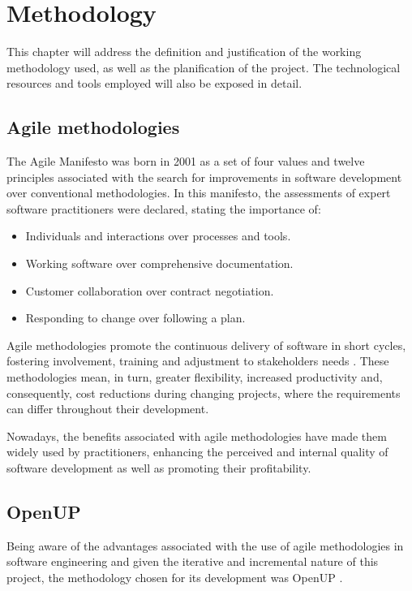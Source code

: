 \chapter{Methodology}
\label{cap:methodology}

This chapter will address the definition and justification of the working methodology used, as well as the planification of the project. The technological resources and tools employed will also be exposed in detail.

\section{Agile methodologies}
\label{sec:agileMethodologies}

The Agile Manifesto \cite{agile_manifesto} was born in 2001 as a set of four values and twelve principles associated with the search for improvements in software development over conventional methodologies. In this manifesto, the assessments of expert software practitioners were declared, stating the importance of:

\begin{itemize}
\item Individuals and interactions over processes and tools.
\item Working software over comprehensive documentation.
\item Customer collaboration over contract negotiation.
\item Responding to change over following a plan.
\end{itemize}

Agile methodologies promote the continuous delivery of software in short cycles, fostering involvement, training and adjustment to stakeholders needs \cite{mora_conversaciones_2017}. These methodologies mean, in turn, greater flexibility, increased productivity and, consequently, cost reductions during changing projects, where the requirements can differ throughout their development.

Nowadays, the benefits associated with agile methodologies have made them widely used by practitioners, enhancing the perceived and internal quality of software development as well as promoting their profitability.

\section{OpenUP}
\label{sec:openUP}

Being aware of the advantages associated with the use of agile methodologies in software engineering and given the iterative and incremental nature of this project, the methodology chosen for its development was OpenUP \cite{macisaac_eclipse}. 

